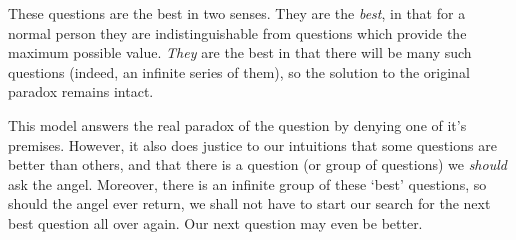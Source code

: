 These questions are the best in two senses.
They are the \emph{best}, in that for a normal person they are indistinguishable from questions which provide the maximum possible value.
\emph{They} are the best in that there will be many such questions (indeed, an infinite series of them), so the solution to the original paradox remains intact.

This model answers the real paradox of the question by denying one of it's premises.
However, it also does justice to our intuitions that some questions are better than others, and that there is a question (or group of questions) we \emph{should} ask the angel.
Moreover, there is an infinite group of these `best' questions, so should the angel ever return, we shall not have to start our search for the next best question all over again.
Our next question may even be better.


